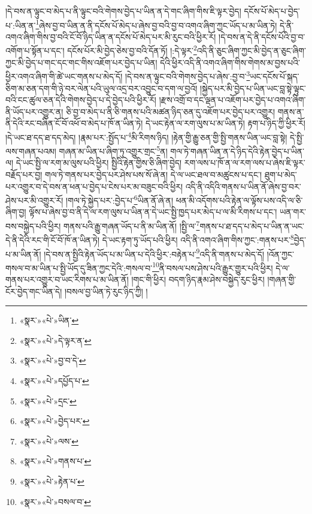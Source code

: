 །དེ་བས་ན་ལྟུང་བ་མེད་པ་ནི་ལྟུང་བའི་གེགས་བྱེད་པ་ཡིན་ན་དེ་གང་ཞིག་གིས་ཇི་ལྟར་བྱེད། དངོས་པོ་མེད་པ་བྱེད་པ་:ཡིན་ན་\footnote{«སྣར་»«པེ་»ཡིན་}ཞེས་བྱ་བ་ཡིན་ན་ནི་དངོས་པོ་མེད་པ་ཞེས་བྱ་བའི་བྱ་བ་འགའ་ཞིག་ཀྱང་ཡོད་པ་མ་ཡིན་ཏེ། དེ་ནི་འགའ་ཞིག་གིས་བྱ་བའི་ངོ་བོ་ཉིད་ཡིན་ན་དངོས་པོ་མེད་པར་མི་རུང་བའི་ཕྱིར་རོ། །དེ་བས་ན་དེ་ནི་དངོས་པོའི་བྱ་བ་འགོག་པ་སྟོན་པ་དང་། དངོས་པོར་མི་བྱེད་ཅེས་བྱ་བའི་དོན་ཏོ། །:དེ་ལྟར་\footnote{«སྣར་»«པེ་»དེ་ལྟར་ན་}འདི་ནི་ཅུང་ཞིག་ཀྱང་མི་བྱེད་ན་ཅུང་ཞིག་ཀྱང་མི་བྱེད་པ་གང་དང་གང་གིས་འཇོག་པར་བྱེད་པ་ཡིན། དེའི་ཕྱིར་འདི་ནི་འགའ་ཞིག་གིས་གེགས་མ་བྱས་པའི་ཕྱིར་འགའ་ཞིག་གི་ཚེ་ཡང་གནས་པ་མེད་དོ། །དེ་བས་ན་ལྟུང་བའི་གེགས་བྱེད་པ་ཞེས་:བྱ་བ་\footnote{«སྣར་»«པེ་»བྱ་བ་དེ་}ཡང་དངོས་པོ་སྐད་ཅིག་མ་ཅན་དག་གི་ཉེ་བར་ལེན་པའི་ཡུལ་འདྲ་བར་འབྱུང་བ་དག་ལ་བྱའོ། །སྐྱེད་པར་མི་བྱེད་པ་ཡིན་ཡང་བླ་སྟེ་ལྟུང་བའི་ངང་ཚུལ་ཅན་དེའི་གེགས་བྱེད་པ་དེ་བྱེད་པའི་ཕྱིར་རོ། །རྫས་འགྲོ་བ་དང་ལྡན་པ་འཇོག་པར་བྱེད་པ་འགའ་ཞིག་ནི་ཡོད་པར་འགྱུར་ན། ཅི་བྱ་བ་མེད་པ་ནི་ཅི་གནས་པའི་མཚན་ཉིད་ཅན་དུ་འཇོག་པར་བྱེད་པར་འགྱུར། གནས་ན་ནི་དེའི་རང་བཞིན་ངོ་བོ་འཕོ་བ་མེད་པ་ཁོ་ན་ཡིན་ཏེ། དེ་ཡང་རྟེན་ལ་རག་ལུས་པ་མ་ཡིན་ཏེ། རྟག་པ་ཉིད་ཀྱི་ཕྱིར་རོ། །དེ་ཡང་ཐ་དད་ཐ་དད་མེད། །རྣམ་པར་:སྤྱོད་པ་\footnote{«སྣར་»«པེ་»དཔྱོད་པ་}མི་རིགས་ཉིད། །རྟེན་གྱི་རྒྱུ་ཅན་གྱི་སྤྱི་གནས་ཡིན་ཡང་བླ་སྟེ། དེ་སྤྱི་ལས་གཞན་པའམ། གཞན་མ་ཡིན་པ་ཞིག་ཏུ་འགྱུར་གྲང་\footnote{«སྣར་»«པེ་»དྲང་}ན། གལ་ཏེ་གཞན་ཡིན་ན་དེ་ཉིད་དེའི་རྟེན་བྱེད་པ་ཡིན་ལ། དེ་ཡང་སྤྱི་ལ་རག་མ་ལུས་པའི་ཕྱིར། སྤྱིའི་རྟེན་གྱིས་ཅི་ཞིག་བྱེད། རག་ལས་པ་ཁོ་ན་ལ་རག་ལས་པ་ཞེས་ཇི་ལྟར་བརྗོད་པར་བྱ། གལ་ཏེ་གནས་པར་བྱེད་པར་ཤེས་པས་སོ་ཞེ་ན། དེ་ལ་ཡང་ཐལ་བ་མཚུངས་པ་དང་། ཐུག་པ་མེད་པར་འགྱུར་བ་དེ་བས་ན་ཕན་པ་བྱེད་པ་ངེས་པར་མ་བཟུང་བའི་ཕྱིར། འདི་ནི་འདིའི་གནས་པ་ཡིན་ནོ་ཞེས་བྱ་བར་ཤེས་པར་མི་འགྱུར་རོ། །གལ་ཏེ་སྐྱེད་པར་:བྱེད་པ་\footnote{«སྣར་»«པེ་»བྱེད་པར་}ཡིན་ནོ་ཞེ་ན། ཕན་མི་འདོགས་པའི་རྟེན་ལ་ལྟོས་པས་འདི་ལ་ཅི་ཞིག་བྱ། ལྟོས་པ་ཞེས་བྱ་བ་ནི་དེ་ལ་རག་ལུས་པ་ཡིན་ན་དེ་ཡང་སྤྱི་ཁྱད་པར་མེད་པ་ལ་མི་རིགས་པ་དང་། ཡན་གར་བས་བསྐྱེད་པའི་ཕྱིར། གནས་པའི་རྒྱུ་གཞན་ཡོད་པ་ནི་མ་ཡིན་ནོ། །སྤྱི་ལ་\footnote{«སྣར་»«པེ་»ལས་}གནས་པ་ཐ་དད་པ་མེད་པ་ཡིན་ན་ཡང་དེ་ནི་དེའི་རང་གི་ངོ་བོ་ཁོ་ན་ཡིན་ཏེ། དེ་ཡང་རྟག་ཏུ་ཡོད་པའི་ཕྱིར། འདི་ནི་འགའ་ཞིག་གིས་ཀྱང་:གནས་པར་\footnote{«སྣར་»«པེ་»གནས་པ་}བྱེད་པ་མ་ཡིན་ནོ། །དེ་བས་ན་སྤྱིའི་རྟེན་ཡོད་པ་མ་ཡིན་པ་དེའི་ཕྱིར་:བརྟེན་པ་\footnote{«སྣར་»«པེ་»རྟེན་པ་}འདི་ནི་གནས་པ་མེད་དོ། །འོན་ཀྱང་གསལ་བ་མ་ཡིན་པ་སྤྱི་ཡོད་དུ་ཟིན་ཀྱང་དེའི་:གསལ་བ་\footnote{«སྣར་»«པེ་»བསལ་བ་}ནི་བསལ་པས་ཤེས་པའི་རྒྱུར་གྱུར་པའི་ཕྱིར། དེ་ལ་གནས་པར་འགྱུར་བ་ཡང་རིགས་པ་མ་ཡིན་ནོ། །གང་གི་ཕྱིར། བདག་ཉིད་རྣམ་ཤེས་བསྐྱེད་རུང་ཕྱིར། །གཞན་གྱི་ངོར་བྱེད་གང་ཡིན་དེ། །བསལ་བྱ་ཡིན་ཏེ་རུང་ཉིད་ཀྱི། །

